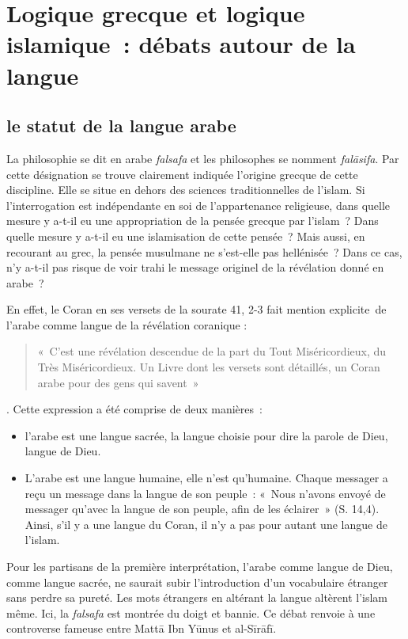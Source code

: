 \section{Logique grecque et logique islamique~:
débats autour de la langue
}


\subsection{le statut de la langue
arabe}

La philosophie se dit en arabe \emph{falsafa} et les philosophes se
nomment \emph{falāsifa}. Par cette désignation se trouve clairement
indiquée l'origine grecque de cette discipline. Elle se situe en dehors
des sciences traditionnelles de l'islam. Si l'interrogation est
indépendante en soi de l'appartenance religieuse, dans quelle mesure y
a-t-il eu une appropriation de la pensée grecque par l'islam~? Dans
quelle mesure y a-t-il eu une islamisation de cette pensée~? Mais aussi,
en recourant au grec, la pensée musulmane ne s'est-elle pas hellénisée~?
Dans ce cas, n'y a-t-il pas risque de voir trahi le message originel de
la révélation donné en arabe~?

En effet, le Coran en ses versets de la sourate 41, 2-3 fait mention
explicite~de l'arabe comme langue de la révélation coranique :
\begin{quote}
    «~C'est
une révélation descendue de la part du Tout Miséricordieux, du Très
Miséricordieux. Un Livre dont les versets sont détaillés, un Coran arabe
pour des gens qui savent~»
\end{quote}.
Cette expression a été comprise de deux
manières~:

\begin{itemize}
\item
  l'arabe est une langue sacrée, la langue choisie pour dire la parole
  de Dieu, langue de Dieu.
\item
  L'arabe est une langue humaine, elle n'est qu'humaine. Chaque messager
  a reçu un message dans la langue de son peuple~: «~Nous n'avons envoyé
  de messager qu'avec la langue de son peuple, afin de les éclairer~»
  (S. 14,4). Ainsi, s'il y a une langue du Coran, il n'y a pas pour
  autant une langue de l'islam.
\end{itemize}

Pour les partisans de la première interprétation, l'arabe comme langue
de Dieu, comme langue sacrée, ne saurait subir l'introduction d'un
vocabulaire étranger sans perdre sa pureté. Les mots étrangers en
altérant la langue altèrent l'islam même. Ici, la \emph{falsafa} est
montrée du doigt et bannie. Ce débat renvoie à une controverse fameuse
entre Mattā Ibn Yūnus et al-Sīrāfī.


